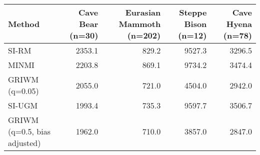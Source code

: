 
\begin{tabular}{lrrrr}
\toprule
Method & Cave Bear (n=30) & Eurasian Mammoth (n=202) & Steppe Bison (n=12) & Cave Hyena (n=78)\\
\midrule
SI-RM & 2353.1 & 829.2 & 9527.3 & 3296.5\\
MINMI & 2203.8 & 869.1 & 9734.2 & 3474.4\\
GRIWM (q=0.05) & 2055.0 & 721.0 & 4504.0 & 2942.0\\
SI-UGM & 1993.4 & 735.3 & 9597.7 & 3506.7\\
GRIWM (q=0.5, bias adjusted) & 1962.0 & 710.0 & 3857.0 & 2847.0\\
\bottomrule
\end{tabular}

